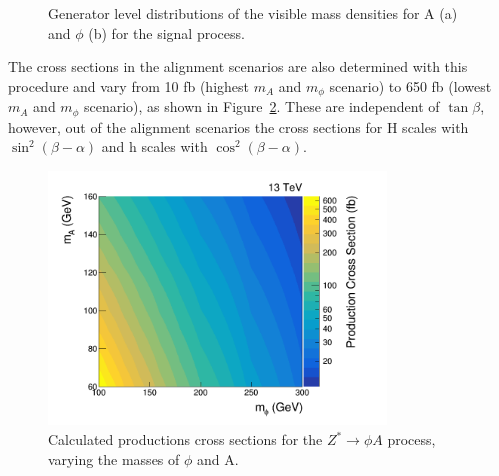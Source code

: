 \begin{figure}[!hbtp]
\centering
\caption{Generator level distributions of the visible mass densities for A (a) and $\phi$ (b) for the signal process.}
\label{fig:4tau_br_1d}
\end{figure}

The cross sections in the alignment scenarios are also determined with this procedure and vary from 10 fb (highest $m_{A}$ and $m_{\phi}$ scenario) to 650 fb (lowest $m_{A}$ and $m_{\phi}$ scenario), as shown in Figure~\ref{fig:4tau_xs}.
These are independent of $\tan\beta$, however, out of the alignment scenarios the cross sections for H scales with $\sin^{2}(\beta-\alpha)$ and h scales with $\cos^{2}(\beta-\alpha)$.

\begin{figure}[!hbtp]
\centering
    \includegraphics[width=0.8\textwidth]{Figures/cross_sections.png}
\caption{Calculated productions cross sections for the $Z^{*} \rightarrow \phi A$ process, varying the masses of $\phi$ and A.}
\label{fig:4tau_xs}
\end{figure}

